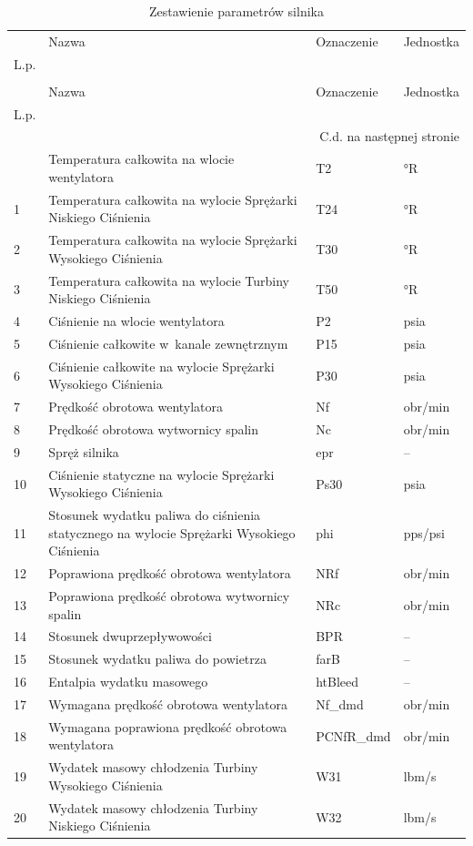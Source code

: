 \begin{longtable}{|p{1cm}||p{7cm}|p{2.2cm}|p{2cm}|}
\caption{\textbf{Zestawienie parametrów silnika}} \label{tab:parametry_silnika} \\
\toprule
 & Nazwa & Oznaczenie & Jednostka \\
L.p. &  &  &  \\
\midrule
\endfirsthead
\caption[]{Zestawienie parametrów silnika} \\
\toprule
 & Nazwa & Oznaczenie & Jednostka \\
L.p. &  &  &  \\
\midrule
\endhead
\midrule
\multicolumn{4}{r}{C.d. na następnej stronie} \\
\midrule
\endfoot
\bottomrule
\endlastfoot
0 & Temperatura całkowita na wlocie wentylatora & T2 & °R \\
1 & Temperatura całkowita na wylocie Sprężarki Niskiego Ciśnienia & T24 & °R \\
2 & Temperatura całkowita na wylocie Sprężarki Wysokiego Ciśnienia & T30 & °R \\
3 & Temperatura całkowita na wylocie Turbiny Niskiego Ciśnienia & T50 & °R \\
4 & Ciśnienie na wlocie wentylatora & P2 & psia \\
5 & Ciśnienie całkowite w~kanale zewnętrznym & P15 & psia \\
6 & Ciśnienie całkowite na wylocie Sprężarki Wysokiego Ciśnienia & P30 & psia \\
7 & Prędkość obrotowa wentylatora & Nf & obr/min \\
8 & Prędkość obrotowa wytwornicy spalin & Nc & obr/min \\
9 & Spręż silnika & epr & -- \\
10 & Ciśnienie statyczne na wylocie Sprężarki Wysokiego Ciśnienia & Ps30 & psia \\
11 & Stosunek wydatku paliwa do ciśnienia statycznego na wylocie Sprężarki Wysokiego Ciśnienia & phi & pps/psi \\
12 & Poprawiona prędkość obrotowa wentylatora & NRf & obr/min \\
13 & Poprawiona prędkość obrotowa wytwornicy spalin & NRc & obr/min \\
14 & Stosunek dwuprzepływowości & BPR & -- \\
15 & Stosunek wydatku paliwa do powietrza & farB & -- \\
16 & Entalpia wydatku masowego & htBleed & -- \\
17 & Wymagana prędkość obrotowa wentylatora & Nf\_dmd & obr/min \\
18 & Wymagana poprawiona prędkość obrotowa wentylatora & PCNfR\_dmd & obr/min \\
19 & Wydatek masowy chłodzenia Turbiny Wysokiego Ciśnienia & W31 & lbm/s \\
20 & Wydatek masowy chłodzenia Turbiny Niskiego Ciśnienia & W32 & lbm/s \\
\end{longtable}
